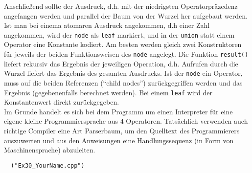 \documentclass[paper=A4, pagesize, DIV=calc, smallheadings,
fontsize=11pt, expansion=false]{scrreprt}
\begin{document}
Anschließend sollte der Ausdruck, d.h. mit der niedrigsten Operatorpräzedenz angefangen werden und parallel der Baum von der Wurzel her aufgebaut werden. Ist man bei einema atomaren Ausdruck angekommen, d.h einer Zahl angekommen, wird der \texttt{node} als \texttt{leaf} markiert, und in der \texttt{union} statt einem Operator eine Konstante kodiert. 
Am besten werden gleich zwei Konstruktoren für jeweils der beiden Funktionsweisen des \texttt{node} angelegt.
Die Funktion \texttt{result()} liefert rekursiv das Ergebnis der jeweiligen Operation, d.h. Aufrufen durch die Wurzel liefert das Ergebnis des gesamten Ausdrucks.
Ist der \texttt{node} ein Operator, muss auf die beiden Referenzen (``child nodes'') zurückgegriffen werden und das Ergebnis (gegebenenfalls berechnet werden).
Bei einem \texttt{leaf} wird der Konstantenwert direkt zurückgegeben.\\
Im Grunde handelt es sich bei dem Programm um einen Interpreter für eine eigene kleine Programmiersprache aus 4 Operatoren.
Tatsächlich verwenden auch richtige Compiler eine Art Parserbaum, um den Quelltext des Programmierers auszuwerten und aus den Anweisungen eine Handlungssequenz (in Form von Maschinensprache) abzuleiten.
\begin{verbatim}
  ("Ex30_YourName.cpp")
\end{verbatim}
\end{document}
